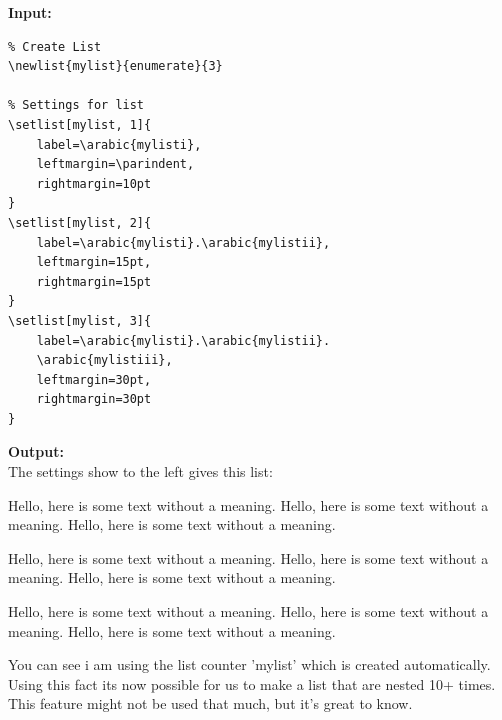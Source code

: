 \documentclass{article}
\newcommand{\randomtext}{Hello, here is some text without a meaning. Hello, here is some text without a meaning. Hello, here is some text without a meaning.} %
\begin{document}
\begin{multicols}{2}
\textbf{Input:} \\
\begin{verbatim}
% Create List
\newlist{mylist}{enumerate}{3}

% Settings for list
\setlist[mylist, 1]{
    label=\arabic{mylisti},
    leftmargin=\parindent,
    rightmargin=10pt
}
\setlist[mylist, 2]{
    label=\arabic{mylisti}.\arabic{mylistii},
    leftmargin=15pt,
    rightmargin=15pt
}
\setlist[mylist, 3]{
    label=\arabic{mylisti}.\arabic{mylistii}.
    \arabic{mylistiii},
    leftmargin=30pt,
    rightmargin=30pt
}
\end{verbatim}
 \newcolumn

    \begin{minipage}{\linewidth}
        \textbf{Output:} \\
        The settings show to the left gives this list:

        \begin{mylist}
        \item \randomtext
        \begin{mylist}
            \item \randomtext
            \begin{mylist}
                \item \randomtext
            \end{mylist}
        \end{mylist}
        \end{mylist}
    \end{minipage}
\end{multicols} %

You can see i am using the list counter 'mylist' which is created automatically. Using this fact its now possible for us to make a list that are nested 10+ times. This feature might not be used that much, but it's great to know.
\newpage
\end{document}
